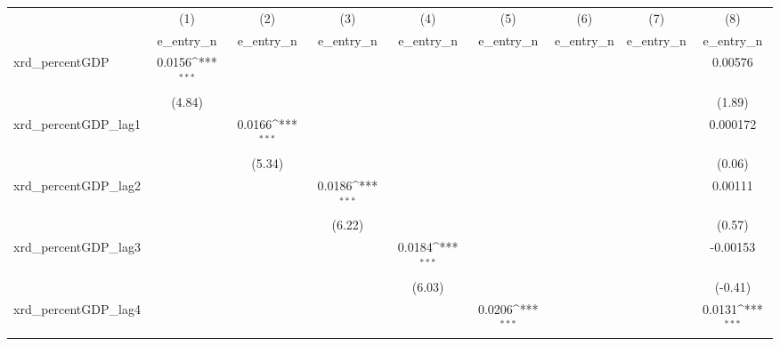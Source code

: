 {
\def\sym#1{\ifmmode^{#1}\else\(^{#1}\)\fi}
\begin{tabular}{l*{8}{c}}
\toprule
          &\multicolumn{1}{c}{(1)}&\multicolumn{1}{c}{(2)}&\multicolumn{1}{c}{(3)}&\multicolumn{1}{c}{(4)}&\multicolumn{1}{c}{(5)}&\multicolumn{1}{c}{(6)}&\multicolumn{1}{c}{(7)}&\multicolumn{1}{c}{(8)}\\
          &\multicolumn{1}{c}{e\_entry\_n}&\multicolumn{1}{c}{e\_entry\_n}&\multicolumn{1}{c}{e\_entry\_n}&\multicolumn{1}{c}{e\_entry\_n}&\multicolumn{1}{c}{e\_entry\_n}&\multicolumn{1}{c}{e\_entry\_n}&\multicolumn{1}{c}{e\_entry\_n}&\multicolumn{1}{c}{e\_entry\_n}\\
\midrule
xrd\_percentGDP&   0.0156\sym{***}&                  &                  &                  &                  &                  &                  &  0.00576         \\
          &   (4.84)         &                  &                  &                  &                  &                  &                  &   (1.89)         \\
\addlinespace
xrd\_percentGDP\_lag1&                  &   0.0166\sym{***}&                  &                  &                  &                  &                  & 0.000172         \\
          &                  &   (5.34)         &                  &                  &                  &                  &                  &   (0.06)         \\
\addlinespace
xrd\_percentGDP\_lag2&                  &                  &   0.0186\sym{***}&                  &                  &                  &                  &  0.00111         \\
          &                  &                  &   (6.22)         &                  &                  &                  &                  &   (0.57)         \\
\addlinespace
xrd\_percentGDP\_lag3&                  &                  &                  &   0.0184\sym{***}&                  &                  &                  & -0.00153         \\
          &                  &                  &                  &   (6.03)         &                  &                  &                  &  (-0.41)         \\
\addlinespace
xrd\_percentGDP\_lag4&                  &                  &                  &                  &   0.0206\sym{***}&                  &                  &   0.0131\sym{***}\\

\end{tabular}}
